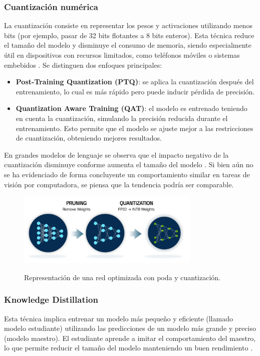 \subsubsection{Cuantización numérica}
La cuantización consiste en representar los pesos y activaciones utilizando menos bits (por ejemplo, pasar de 32 bits flotantes a 8 bits enteros). Esta técnica reduce el tamaño del modelo y disminuye el consumo de memoria, siendo especialmente útil en dispositivos con recursos limitados, como teléfonos móviles o sistemas embebidos \cite{Jacob2018}. Se distinguen dos enfoques principales:

\begin{itemize}
\setlength\itemsep{-0.3em}
    \item \textbf{Post-Training Quantization (PTQ)}: se aplica la cuantización después del entrenamiento, lo cual es más rápido pero puede inducir pérdida de precisión.
    \item \textbf{Quantization Aware Training (QAT)}: el modelo es entrenado teniendo en cuenta la cuantización, simulando la precisión reducida durante el entrenamiento. Esto permite que el modelo se ajuste mejor a las restricciones de cuantización, obteniendo mejores resultados.
\end{itemize}

En grandes modelos de lenguaje se observa que el impacto negativo de la cuantización disminuye conforme aumenta el tamaño del modelo \cite{Yao2024}. Si bien aún no se ha evidenciado de forma concluyente un comportamiento similar en tareas de visión por computadora, se piensa que la tendencia podría ser comparable.

\begin{figure}[htbp]
\centering
\includegraphics[width=0.78\textwidth]{figures/pruning_quantization.png}
\label{pruning_quantization}
\caption[Representación de una red optimizada con poda y cuantización]{Representación de una red optimizada con poda y cuantización.}
\end{figure}

\subsubsection{Knowledge Distillation}
Esta técnica implica entrenar un modelo más pequeño y eficiente (llamado modelo estudiante) utilizando las predicciones de un modelo más grande y preciso (modelo maestro). El estudiante aprende a imitar el comportamiento del maestro, lo que permite reducir el tamaño del modelo manteniendo un buen rendimiento \cite{Cheng2018}.

